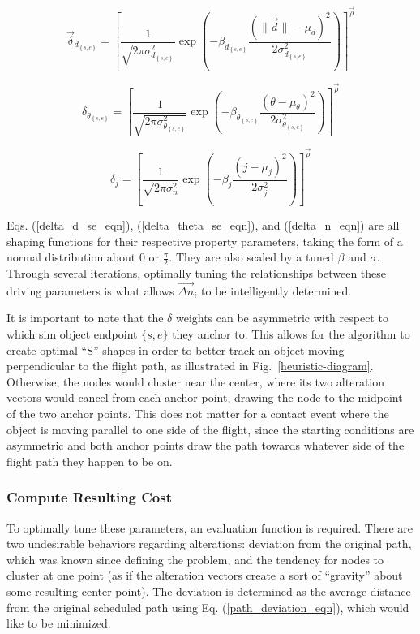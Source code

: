 \documentclass[conf]{new-aiaa}
\begin{document}
\begin{equation}
\label{delta_d_se_eqn}
\vec{\delta}_{d_{\left\{s,e\right\}}} = \left[\frac{1}{\sqrt{2\pi{\sigma_{d_{\left\{s,e\right\}}}^2}}}\exp\left({-\beta_{d_{\left\{s,e\right\}}}\frac{{\left(\|{\vec{d}}\| - \mu_d\right)}^2}{2\sigma_{d_{\left\{s,e\right\}}}^2}}\right)\right]^{\vec{\rho}}
\end{equation}

\begin{equation}
\label{delta_theta_se_eqn}
\delta_{\theta_{\left\{s,e\right\}}} = \left[\frac{1}{\sqrt{2\pi\sigma_{\theta_{\left\{s,e\right\}}}^2}}\exp\left({-\beta_{\theta_{\left\{s,e\right\}}}\frac{{\left(\theta - \mu_\theta\right)}^2}{2\sigma_{\theta_{\left\{s,e\right\}}}^2}}\right)\right]^{\vec{\rho}}
\end{equation}

\begin{equation}
\label{delta_n_eqn}
\delta_j = \left[\frac{1}{\sqrt{2\pi\sigma_n^2}}\exp\left({-\beta_j\frac{{\left(j - \mu_j\right)}^2}{2\sigma_j^2}}\right)\right]^{\vec{\rho}}
\end{equation}

Eqs. (\ref{delta_d_se_eqn}), (\ref{delta_theta_se_eqn}), and (\ref{delta_n_eqn}) are all shaping functions for their respective property parameters, taking the form of a normal distribution about $0$ or $\frac{\pi}{2}$. They are also scaled by a tuned $\beta$ and $\sigma$. Through several iterations, optimally tuning the relationships between these driving parameters is what allows $\vec{{\Delta}{n}}_i$ to be intelligently determined.

It is important to note that the $\delta$ weights can be asymmetric with respect to which sim object endpoint $\{s,e\}$ they anchor to. This allows for the algorithm to create optimal ``S''-shapes in order to better track an object moving perpendicular to the flight path, as illustrated in Fig.~\ref{heuristic-diagram}. Otherwise, the nodes would cluster near the center, where its two alteration vectors would cancel from each anchor point, drawing the node to the midpoint of the two anchor points. This does not matter for a contact event where the object is moving parallel to one side of the flight, since the starting conditions are asymmetric and both anchor points draw the path towards whatever side of the flight path they happen to be on.

\subsubsection{Compute Resulting Cost}
To optimally tune these parameters, an evaluation function is required. There are two undesirable behaviors regarding alterations: deviation from the original path, which was known since defining the problem, and the tendency for nodes to cluster at one point (as if the alteration vectors create a sort of ``gravity'' about some resulting center point). The deviation is determined as the average distance from the original scheduled path using Eq. (\ref{path_deviation_eqn}), which would like to be minimized. 
\end{document}

